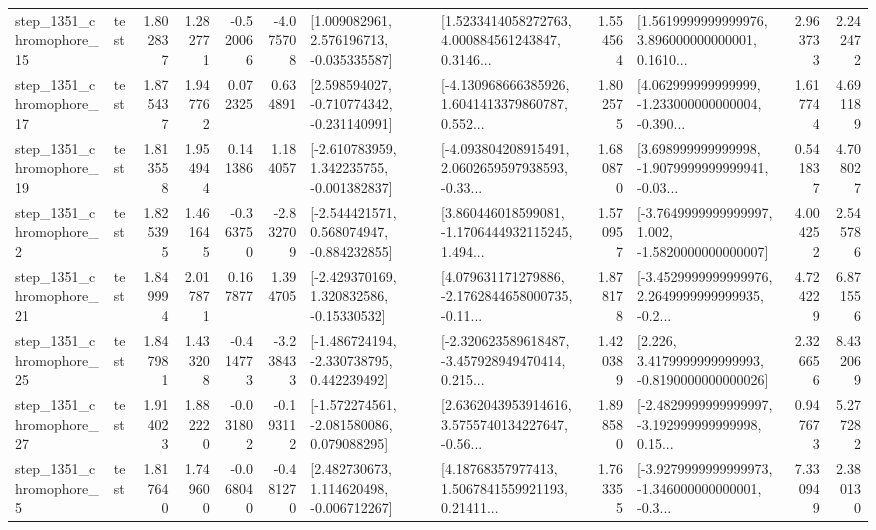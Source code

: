 \begin{tabular}{llrrrrllrlrr}
 step\_1351\_chromophore\_15 &      test &      1.802837 &    1.282771 &     -0.520066 & -4.075708 &    [1.009082961, 2.576196713, -0.035335587] &  [1.5233414058272763, 4.000884561243847, 0.3146... &       1.554564 &  [1.5619999999999976, 3.896000000000001, 0.1610... &            2.963733 &          2.242472 \\
 step\_1351\_chromophore\_17 &      test &      1.875437 &    1.947762 &      0.072325 &  0.634891 &   [2.598594027, -0.710774342, -0.231140991] &  [-4.130968666385926, 1.6041413379860787, 0.552... &       1.802575 &  [4.062999999999999, -1.233000000000004, -0.390... &            1.617744 &          4.691189 \\
 step\_1351\_chromophore\_19 &      test &      1.813558 &    1.954944 &      0.141386 &  1.184057 &   [-2.610783959, 1.342235755, -0.001382837] &  [-4.093804208915491, 2.0602659597938593, -0.33... &       1.680870 &  [3.698999999999998, -1.9079999999999941, -0.03... &            0.541837 &          4.708027 \\
  step\_1351\_chromophore\_2 &      test &      1.825395 &    1.461645 &     -0.363750 & -2.832709 &   [-2.544421571, 0.568074947, -0.884232855] &  [3.860446018599081, -1.1706444932115245, 1.494... &       1.570957 &  [-3.7649999999999997, 1.002, -1.5820000000000007] &            4.004252 &          2.545786 \\
 step\_1351\_chromophore\_21 &      test &      1.849994 &    2.017871 &      0.167877 &  1.394705 &    [-2.429370169, 1.320832586, -0.15330532] &  [4.079631171279886, -2.1762844658000735, -0.11... &       1.878178 &  [-3.4529999999999976, 2.2649999999999935, -0.2... &            4.724229 &          6.871556 \\
 step\_1351\_chromophore\_25 &      test &      1.847981 &    1.433208 &     -0.414773 & -3.238433 &   [-1.486724194, -2.330738795, 0.442239492] &  [-2.320623589618487, -3.457928949470414, 0.215... &       1.420389 &   [2.226, 3.4179999999999993, -0.8190000000000026] &            2.326656 &          8.432069 \\
 step\_1351\_chromophore\_27 &      test &      1.914023 &    1.882220 &     -0.031802 & -0.193112 &   [-1.572274561, -2.081580086, 0.079088295] &  [2.6362043953914616, 3.5755740134227647, -0.56... &       1.898580 &  [-2.4829999999999997, -3.192999999999998, 0.15... &            0.947673 &          5.277282 \\
  step\_1351\_chromophore\_5 &      test &      1.817640 &    1.749600 &     -0.068040 & -0.481270 &    [2.482730673, 1.114620498, -0.006712267] &  [4.18768357977413, 1.5067841559921193, 0.21411... &       1.763355 &  [-3.9279999999999973, -1.346000000000001, -0.3... &            7.330949 &          2.380130 \\

\end{tabular}
